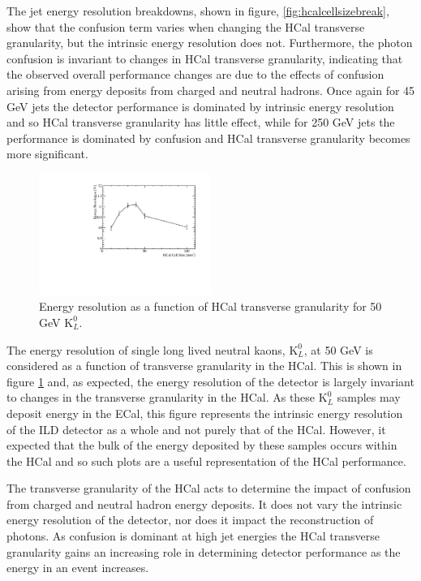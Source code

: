 The jet energy resolution breakdowns, shown in figure, \ref{fig:hcalcellsizebreak}, show that the confusion term varies when changing the HCal transverse granularity, but the intrinsic energy resolution does not.  Furthermore, the photon confusion is invariant to changes in HCal transverse granularity, indicating that the observed overall performance changes are due to the effects of confusion arising from energy deposits from charged and neutral hadrons.  Once again for 45 GeV jets the detector performance is dominated by intrinsic energy resolution and so HCal transverse granularity has little effect, while for 250 GeV jets the performance is dominated by confusion and HCal transverse granularity becomes more significant.  

\begin{figure}
\centering
\includegraphics[width=0.5\textwidth]{OptimisationStudies/Plots/EnergyResolution/ER_vs_HCalCellSize_50GeVKaon0L.pdf}
\caption[Energy resolution as a function of HCal transverse granularity for 50 GeV $\text{K}^{0}_{L}$.]{Energy resolution as a function of HCal transverse granularity for 50 GeV $\text{K}^{0}_{L}$.}
\label{fig:hcalcellskaon}
\end{figure}

The energy resolution of single long lived neutral kaons, $\text{K}^{0}_{L}$, at 50 GeV is considered as a function of transverse granularity in the HCal.  This is shown in figure \ref{fig:hcalcellskaon} and, as expected, the energy resolution of the detector is largely invariant to changes in the transverse granularity in the HCal.  As these $\text{K}^{0}_{L}$ samples may deposit energy in the ECal, this figure represents the intrinsic energy resolution of the ILD detector as a whole and not purely that of the HCal.  However, it expected that the bulk of the energy deposited by these samples occurs within the HCal and so such plots are a useful representation of the HCal performance.  

The transverse granularity of the HCal acts to determine the impact of confusion from charged and neutral hadron energy deposits.  It does not vary the intrinsic energy resolution of the detector, nor does it impact the reconstruction of photons.  As confusion is dominant at high jet energies the HCal transverse granularity gains an increasing role in determining detector performance as the energy in an event increases. 


